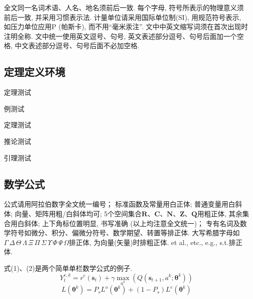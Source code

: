 \documentclass{aas}
\begin{document}
全文同一名词术语、人名、地名须前后一致. 每个字母, 符号所表示的物理意义须前后一致, 并采用习惯表示法. 计量单位请采用国际单位制(SI), 用规范符号表示, 如压力单位应用P (帕斯卡), 而不用``毫米汞注''. 文中中英文缩写词须在首次出现时注明全称. 文中统一使用英文逗号、句号, 英文表述部分逗号、句号后面加一个空格, 中文表述部分逗号、句号后面不必加空格.

\subsection{定理定义环境}

\begin{theorem}
定理测试
\end{theorem}

\begin{example}
例测试
\end{example}

\begin{definition}
定理测试
\end{definition}

\begin{corollary}
推论测试
\end{corollary}

\begin{lemma}
引理测试
\end{lemma}

\subsection{数学公式}


公式请用阿拉伯数字全文统一编号； 标准函数及常量用白正体;
普通变量用白斜体; 向量、矩阵用粗/白斜体均可;
5个空间集合$\mathbf{R}$、$\mathbf{C}$、$\mathbf{N}$、$\mathbf{Z}$、$\mathbf{Q}$用粗正体,
其余集合用白斜体; 上下角标位置明显, 书写准确 (以上均注意全文统一)；
专有名词及数学符号如微分、积分、偏微分符号、数学期望、转置等排正体.
大写希腊字母如$\Gamma\,\Delta\,\Theta\,\Lambda\,\Xi\,\Pi\,\Sigma\,
\Upsilon\,\Phi\,\Psi\,\Omega$排正体, 为向量(矢量)时排粗正体. et al.,
etc., e.g., s.t.排正体.

式(1)、(2)是两个简单单栏数学公式的例子.
\begin{equation}
Y_t^{e,k} = r_{}^e\left( {{{\boldsymbol s}_t}} \right) + \gamma \mathop {\max }\limits_{{a^k}} \left( {Q\left( {{{\boldsymbol s}_{t + 1}},{a^k};{{\boldsymbol \theta} ^k}} \right)} \right)
\end{equation}
\begin{equation}
L\left( {{{\boldsymbol \theta} ^k}} \right) = {P_s}{L^o}\left( {{{\boldsymbol \theta} ^k}} \right) + \left( {1 - {P_s}} \right){L^e}\left( {{{\boldsymbol \theta} ^k}} \right)
\end{equation}
\end{document}
